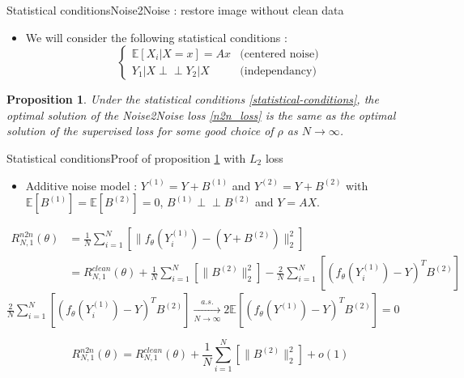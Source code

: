 \documentclass{beamer}
\newtheorem{proposition}{Proposition}
\numberwithin{proposition}{section}
\begin{document}
\begin{frame}{Statistical conditions}{Noise2Noise : restore image without clean data}


    \begin{itemize}
        \item We will consider the following statistical conditions :
        \begin{equation}
            \begin{cases}
                \mathbb{E} \left[X_i | X=x\right] = Ax & \text{(centered noise)} \\
                Y_1 | X \perp\!\!\!\!\perp Y_2 | X & \text{(independancy)}
            \end{cases}
        \label{statistical-conditions}
        \end{equation}
    \end{itemize}

    \begin{proposition}
        Under the statistical conditions \ref{statistical-conditions}, the optimal solution of the Noise2Noise loss \ref{n2n_loss} is the same as the optimal solution of the supervised loss for some good choice of $\rho$ as $N \to \infty$.
        \label{n2n-prop}
    \end{proposition}
\end{frame}

\begin{frame}{Statistical conditions}{Proof of proposition \ref{n2n-prop} with $L_2$ loss}
    \begin{itemize}
        \item Additive noise model : $Y^{(1)} = Y + B^{(1)}$ and $Y^{(2)} = Y + B^{(2)}$ with $\mathbb{E}[B^{(1)}] = \mathbb{E}[B^{(2)}] = 0$, $B^{(1)} \perp\!\!\!\!\perp B^{(2)}$ and $Y=AX$.
    \end{itemize}
    \begin{align*}
        R_{N,1}^{n2n}(\theta) &= \frac{1}{N} \sum_{i=1}^N \left[ \| f_\theta(Y_i^{(1)}) - (Y + B^{(2)}) \|_2^2 \right] \\
        &= R_{N,1}^{clean}(\theta) + \frac{1}{N} \sum_{i=1}^N \left[ \| B^{(2)} \|_2^2 \right] - \frac{2}{N} \sum_{i=1}^N \left[ (f_\theta(Y_i^{(1)}) - Y)^T B^{(2)} \right]
    \end{align*}
    $\frac{2}{N} \sum_{i=1}^N \left[ (f_\theta(Y_i^{(1)}) - Y)^T B^{(2)} \right] \xrightarrow[N \to \infty]{a.s.} 2 \mathbb{E} \left[ (f_\theta(Y^{(1)}) - Y)^T B^{(2)} \right] = 0$ %
    \begin{tcolorbox}[
        colback=myblue!5,
        colframe=myblue,
        boxrule=0.8pt,
        arc=2mm,
        left=2mm,
        right=2mm,
        top=1mm,
        bottom=1mm
    ]
    \[
        R_{N,1}^{n2n}(\theta) = R_{N,1}^{clean}(\theta) + \frac{1}{N} \sum_{i=1}^N \left[ \| B^{(2)} \|_2^2 \right] + o(1)
    \]
    \end{tcolorbox}
\end{frame}
\end{document}
